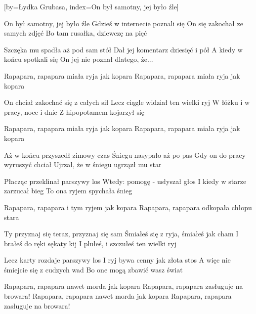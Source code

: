 [by={Łydka Grubasa},
                     index={On był samotny, jej było źle}]
\beginverse

On był samotny, jej było źle
Gdzieś w internecie poznali się
On się zakochał ze samych zdjęć
Bo tam rusałka, dziewczę na pięć

\endverse
\beginverse

Szczęka mu spadła aż pod sam stół
Dał jej komentarz dziesięć i pół
A kiedy w końcu spotkali się
On jej nie poznał dlatego, że...

\endverse
\beginverse

Rapapara, rapapara miała ryja jak kopara
Rapapara, rapapara miała ryja jak kopara

\endverse
\beginverse

On chciał zakochać się z całych sił
Lecz ciągle widział ten wielki ryj
W łóżku i w pracy, noce i dnie
Z hipopotamem kojarzył się

\endverse
\beginverse

Rapapara, rapapara miała ryja jak kopara
Rapapara, rapapara miała ryja jak kopara

\endverse
\beginverse

Aż w końcu przyszedł zimowy czas
Śniegu nasypało aż po pas
Gdy on do pracy wyruszyć chciał
Ujrzał, że w śniegu ugrzązł mu star

\endverse
\beginverse

Płacząc przeklinał parszywy los
Wtedy: pomogę - usłyszał głos
I kiedy w starze zarzucał bieg
To ona ryjem spychała śnieg

\endverse
\beginverse

Rapapara, rapapara i tym ryjem jak kopara
Rapapara, rapapara odkopała chłopu stara

\endverse
\beginverse

Ty przyznaj się teraz, przyznaj się sam
Śmiałeś się z ryja, śmiałeś jak cham
I brałeś do ręki sękaty kij
I plułeś, i szczułeś ten wielki ryj

\endverse
\beginverse

Lecz karty rozdaje parszywy los
I ryj bywa cenny jak złota stos
A więc nie śmiejcie się z cudzych wad
Bo one mogą zbawić wasz świat

\endverse
\beginverse

Rapapara, rapapara nawet morda jak kopara
Rapapara, rapapara zasługuje na browara!
Rapapara, rapapara nawet morda jak kopara
Rapapara, rapapara zasługuje na browara!

\endverse
\endsong